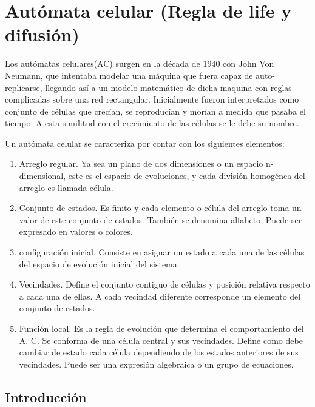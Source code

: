 \section{Autómata celular (Regla de life y difusión)}
Los autómatas celulares(AC) surgen en la década de 1940 con John Von Neumann, que intentaba modelar una máquina que fuera capaz de auto-replicarse, llegando así a un modelo matemático de dicha maquina con reglas complicadas sobre una red rectangular. Inicialmente fueron interpretados como conjunto de células que crecían, se reproducían y morían a medida que pasaba el tiempo. A esta similitud con el crecimiento de las células se le debe su nombre.\cite{PAGINA}

Un autómata celular se caracteriza por contar con los siguientes elementos:
\begin{enumerate}
 \item Arreglo regular. Ya sea un plano de dos dimensiones o un espacio n-dimensional, este es el espacio de evoluciones, y cada división homogénea del arreglo es llamada célula.
 \item Conjunto de estados. Es finito y cada elemento o célula del arreglo toma un valor de este conjunto de estados. También se denomina alfabeto. Puede ser expresado en valores o colores.
 \item configuración inicial. Consiste en asignar un estado a cada una de las células del espacio de evolución inicial del sistema.
 \item Vecindades. Define el conjunto contiguo de células y posición relativa respecto a cada una de ellas. A cada vecindad diferente corresponde un elemento del conjunto de estados.
 \item Función local. Es la regla de evolución que determina el comportamiento del A. C. Se conforma de una célula central y sus vecindades. Define como debe cambiar de estado cada célula dependiendo de los estados anteriores de sus vecindades. Puede ser una expresión algebraica o un grupo de ecuaciones.
\end{enumerate}

\subsection{Introducción}
